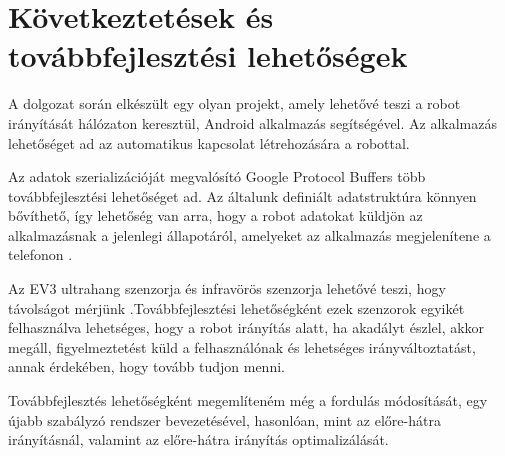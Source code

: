\chapter{Következtetések és továbbfejlesztési lehetőségek}
A dolgozat során elkészült egy olyan projekt, amely lehetővé teszi a robot irányítását hálózaton keresztül, Android alkalmazás segítségével. Az alkalmazás lehetőséget ad az automatikus kapcsolat létrehozására a robottal.

Az adatok szerializációját megvalósító Google Protocol Buffers több továbbfejlesztési lehetőséget ad. Az általunk definiált adatstruktúra könnyen bővíthető, így lehetőség van arra, hogy a robot adatokat küldjön az alkalmazásnak a jelenlegi állapotáról, amelyeket az alkalmazás megjelenítene a telefonon . 

Az EV3 ultrahang szenzorja és infravörös szenzorja lehetővé teszi, hogy távolságot mérjünk .Továbbfejlesztési lehetőségként ezek szenzorok egyikét felhasználva lehetséges, hogy a robot irányítás alatt, ha akadályt észlel, akkor megáll, figyelmeztetést küld a felhasználónak és lehetséges irányváltoztatást, annak érdekében, hogy tovább tudjon menni.

Továbbfejlesztés lehetőségként megemlíteném még a fordulás módosítását, egy újabb szabályzó rendszer bevezetésével, hasonlóan, mint az előre-hátra irányításnál, valamint az előre-hátra irányítás optimalizálását.



